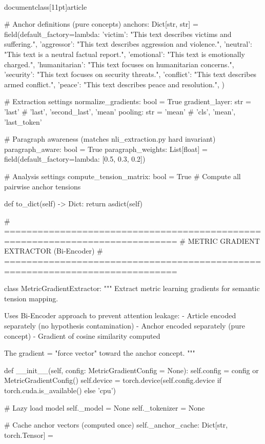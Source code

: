 \\documentclass[11pt]{article}
\begin{document}
\begin{CodeBlock}
    # Anchor definitions (pure concepts)
    anchors: Dict[str, str] = field(default_factory=lambda: {
        'victim': "This text describes victims and suffering.",
        'aggressor': "This text describes aggression and violence.",
        'neutral': "This text is a neutral factual report.",
        'emotional': "This text is emotionally charged.",
        'humanitarian': "This text focuses on humanitarian concerns.",
        'security': "This text focuses on security threats.",
        'conflict': "This text describes armed conflict.",
        'peace': "This text describes peace and resolution.",
    })
    
    # Extraction settings
    normalize_gradients: bool = True
    gradient_layer: str = 'last'  # 'last', 'second_last', 'mean'
    pooling: str = 'mean'  # 'cls', 'mean', 'last_token'
    
    # Paragraph awareness (matches nli_extraction.py hard invariant)
    paragraph_aware: bool = True
    paragraph_weights: List[float] = field(default_factory=lambda: [0.5, 0.3, 0.2])

    # Analysis settings
    compute_tension_matrix: bool = True  # Compute all pairwise anchor tensions
    
    def to_dict(self) -> Dict:
        return asdict(self)


# =============================================================================
# METRIC GRADIENT EXTRACTOR (Bi-Encoder)
# =============================================================================

class MetricGradientExtractor:
    """
    Extract metric learning gradients for semantic tension mapping.
    
    Uses Bi-Encoder approach to prevent attention leakage:
    - Article encoded separately (no hypothesis contamination)
    - Anchor encoded separately (pure concept)
    - Gradient of cosine similarity computed
    
    The gradient = "force vector" toward the anchor concept.
    """
    
    def __init__(self, config: MetricGradientConfig = None):
        self.config = config or MetricGradientConfig()
        self.device = torch.device(self.config.device if torch.cuda.is_available() else 'cpu')
        
        # Lazy load model
        self._model = None
        self._tokenizer = None
        
        # Cache anchor vectors (computed once)
        self._anchor_cache: Dict[str, torch.Tensor] = {}
        

\end{CodeBlock}
\end{document}
